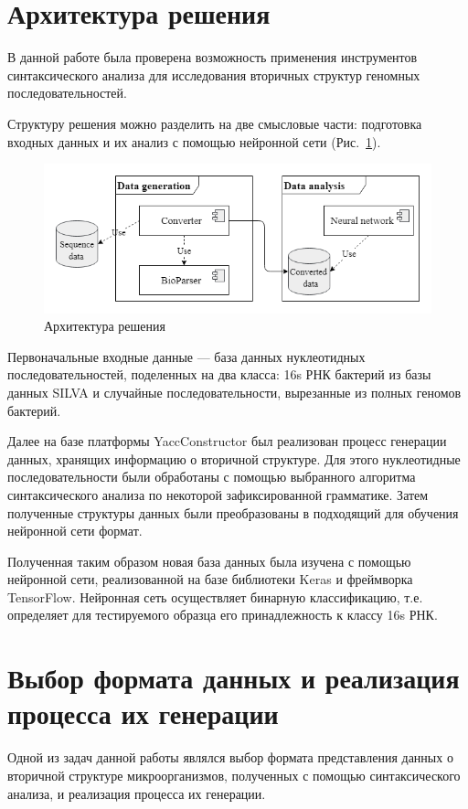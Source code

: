 \documentclass[14pt]{matmex-diploma}
\begin{document}
\section{Архитектура решения}
В данной работе была проверена возможность применения инструментов синтаксического анализа для исследования вторичных структур геномных последовательностей.

Структуру решения можно разделить на две смысловые части: подготовка входных данных и их анализ с помощью нейронной сети (Рис.~\ref{1}).

\begin{figure}[!ht]
\centering
\includegraphics[width=15cm]{architecture.png}
\caption{Архитектура решения}
\label{1}
\end{figure}

Первоначальные входные данные --- база данных нуклеотидных последовательностей, поделенных на два класса: 16s РНК бактерий из базы данных SILVA и случайные последовательности, вырезанные из полных геномов бактерий.

Далее на базе платформы YaccConstructor был реализован процесс генерации данных, хранящих информацию о вторичной структуре. Для этого нуклеотидные последовательности были обработаны с помощью выбранного алгоритма синтаксического анализа по некоторой зафиксированной грамматике. Затем полученные структуры данных были преобразованы в подходящий для обучения нейронной сети формат.


Полученная таким образом новая база данных была изучена с помощью нейронной сети, реализованной на базе библиотеки Keras и фреймворка TensorFlow. Нейронная сеть осуществляет бинарную классификацию, т.е. определяет для тестируемого образца его принадлежность к классу 16s РНК.


\section{Выбор формата данных и реализация процесса их генерации}
Одной из задач данной работы являлся выбор формата представления данных о вторичной структуре микроорганизмов, полученных с помощью синтаксического анализа, и реализация процесса их генерации. 
\end{document}
